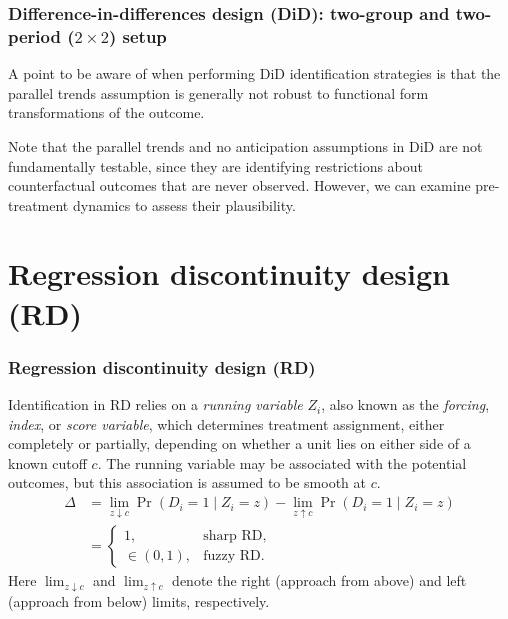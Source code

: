 \documentclass[12pt, compress]{beamer}
\begin{document}
\begin{frame}
	\frametitle{Difference-in-differences design (DiD): two-group and two-period ($2\times2$) setup}
A point to be aware of when performing DiD identification strategies is that the parallel trends assumption is generally not robust to functional form transformations of the outcome.

Note that the parallel trends and no anticipation assumptions in DiD are not fundamentally testable, since they are identifying restrictions about counterfactual outcomes that are never observed. However, we can examine pre-treatment dynamics to assess their plausibility.
\end{frame}

\section{Regression discontinuity design (RD)}
\begin{frame}
	\frametitle{Regression discontinuity design (RD)}
Identification in RD relies on a \textit{running variable} $Z_i$, also known as the \textit{forcing}, \textit{index}, or \textit{score variable}, which determines treatment assignment, either completely or partially, depending on whether a unit lies on either side of a known cutoff $c$. The running variable may be associated with the potential outcomes, but this association is assumed to be smooth at $c$.
\begin{align*}
    \Delta &= \lim_{z \downarrow c}\Pr(D_i=1\mid Z_i=z)-\lim_{z \uparrow c}\Pr(D_i=1\mid Z_i=z)\\
&=
\begin{cases}
	1, & \text{sharp RD},\\[2pt]
	\in(0,1), & \text{fuzzy RD}.
\end{cases}
\end{align*}
Here $\lim_{z \downarrow c}$ and $\lim_{z \uparrow c}$ denote the right (approach from above) and left (approach from below) limits, respectively.
\end{frame}
\end{document}
